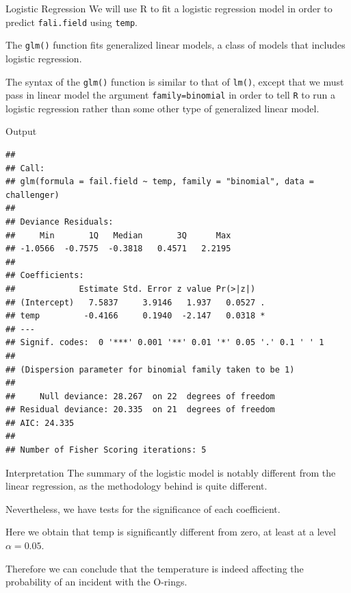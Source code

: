 \documentclass[
  ignorenonframetext,
]{beamer}
\begin{document}
\begin{frame}[fragile]{Logistic Regression}
\protect\hypertarget{logistic-regression}{}
We will use R to fit a logistic regression model in order to predict
\texttt{fali.field} using \texttt{temp}.

The \texttt{glm()} function fits generalized linear models, a class of
models that includes logistic regression.

The syntax of the \texttt{glm()} function is similar to that of
\texttt{lm()}, except that we must pass in linear model the argument
\texttt{family=binomial} in order to tell \texttt{R} to run a logistic
regression rather than some other type of generalized linear model.
\end{frame}

\begin{frame}[fragile]{Output}
\protect\hypertarget{output}{}
\begin{verbatim}
## 
## Call:
## glm(formula = fail.field ~ temp, family = "binomial", data = challenger)
## 
## Deviance Residuals: 
##     Min       1Q   Median       3Q      Max  
## -1.0566  -0.7575  -0.3818   0.4571   2.2195  
## 
## Coefficients:
##             Estimate Std. Error z value Pr(>|z|)  
## (Intercept)   7.5837     3.9146   1.937   0.0527 .
## temp         -0.4166     0.1940  -2.147   0.0318 *
## ---
## Signif. codes:  0 '***' 0.001 '**' 0.01 '*' 0.05 '.' 0.1 ' ' 1
## 
## (Dispersion parameter for binomial family taken to be 1)
## 
##     Null deviance: 28.267  on 22  degrees of freedom
## Residual deviance: 20.335  on 21  degrees of freedom
## AIC: 24.335
## 
## Number of Fisher Scoring iterations: 5
\end{verbatim}
\end{frame}

\begin{frame}{Interpretation}
\protect\hypertarget{interpretation}{}
The summary of the logistic model is notably different from the linear
regression, as the methodology behind is quite different.

Nevertheless, we have tests for the significance of each coefficient.

Here we obtain that temp is significantly different from zero, at least
at a level \(\alpha = 0.05\).

Therefore we can conclude that the temperature is indeed affecting the
probability of an incident with the O-rings.
\end{frame}
\end{document}
